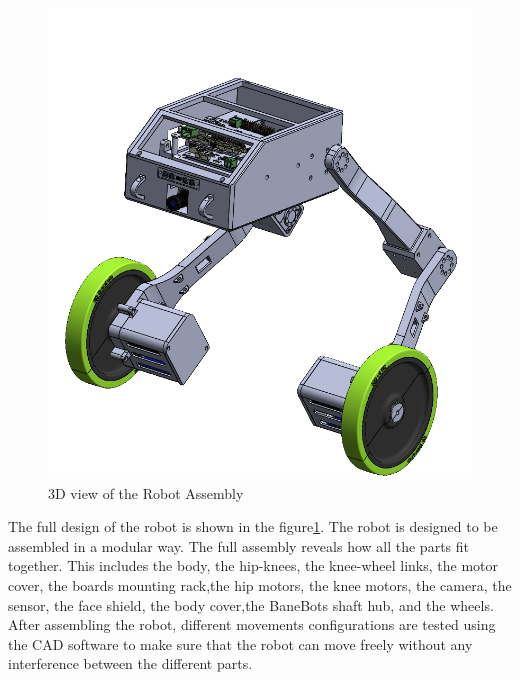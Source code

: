 \begin{figure}[h]
	\centering
	\includegraphics[width=1\linewidth]{Robot_Assembly_3}
	\caption[3D view of the Robot Assembly]{3D view of the Robot Assembly}
	\label{fig:robotassembly3}
\end{figure}
\vspace{3cm}
The full design of the robot is shown in the figure\ref{fig:robotassembly3}.
The robot is designed to be assembled in a modular way.
The full assembly reveals how all the parts fit together.
This includes the body, the hip-knees, the knee-wheel links, the motor cover, the boards mounting rack,the hip motors, the knee motors, the camera, the sensor, the face shield, the body cover,the BaneBots shaft hub, and the wheels.
After assembling the robot, different movements configurations are tested using the CAD software to make sure that the robot can move freely without any interference between the different parts.
\newpage
